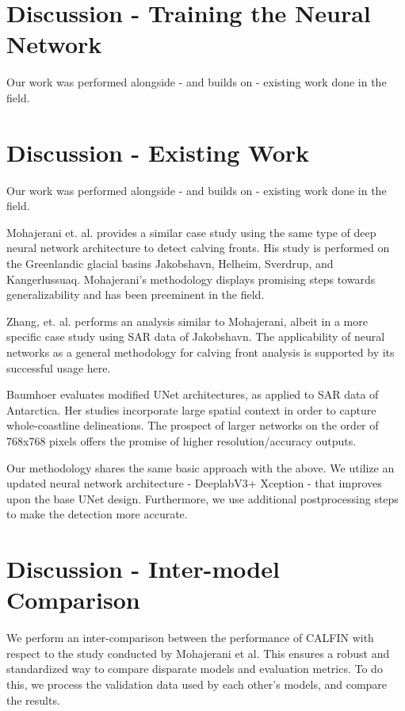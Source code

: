 \documentclass[tc, manuscript]{copernicus}
\begin{document}
\section{Discussion - Training the Neural Network}

Our work was performed alongside - and builds on - existing work done in the field.


\section{Discussion - Existing Work}
Our work was performed alongside - and builds on - existing work done in the field.

Mohajerani et. al.\cite{mohajerani-rs} provides a similar case study using the same type of deep neural network architecture to detect calving fronts. His study is performed on the Greenlandic glacial basins Jakobshavn, Helheim, Sverdrup, and Kangerlussuaq. Mohajerani's methodology displays promising steps towards generalizability and has been preeminent in the field.

Zhang, et. al.\cite{zhang-tc} performs an analysis similar to Mohajerani, albeit in a more specific case study using SAR data of Jakobshavn. The applicability of neural networks as a general methodology for calving front analysis is supported by its successful usage here. 

Baumhoer evaluates modified UNet architectures, as applied to SAR data of Antarctica. Her studies incorporate large spatial context in order to capture whole-coastline delineations. The prospect of larger networks on the order of 768x768 pixels offers the promise of higher resolution/accuracy outputs.

Our methodology shares the same basic approach with the above. We utilize an updated neural network architecture - DeeplabV3+ Xception - that improves upon the base UNet design. Furthermore, we use additional postprocessing steps to make the detection more accurate.

\section{Discussion - Inter-model Comparison}

We perform an inter-comparison between the performance of CALFIN with respect to the study conducted by Mohajerani et al. This ensures a robust and standardized way to compare disparate models and evaluation metrics.
To do this, we process the validation data used by each other's models, and compare the results.
\end{document}
